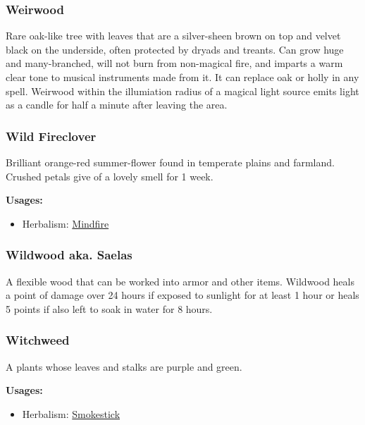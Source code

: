 \subsubsection{Weirwood}

Rare oak-like tree with leaves that are a silver-sheen brown on top and velvet black on the underside, often protected by dryads and treants. Can grow huge and many-branched, will not burn from non-magical fire, and imparts a warm clear tone to musical instruments made from it. It can replace oak or holly in any spell. Weirwood within the illumiation radius of a magical light source emits light as a candle for half a minute after leaving the area.

\subsubsection{Wild Fireclover}
\label{Wild Fireclover}

Brilliant orange-red summer-flower found in temperate plains and farmland. Crushed petals give of a lovely smell for 1 week.

\vspace{5mm}

\textbf{Usages:}

\begin{itemize}[noitemsep]
\item[] Herbalism: \hyperref[Mindfire]{Mindfire}
\end{itemize}

\subsubsection{Wildwood aka. Saelas}

A flexible wood that can be worked into armor and other items. Wildwood heals a point of damage over 24 hours if exposed to sunlight for at least 1 hour or heals 5 points if also left to soak in water for 8 hours.

\subsubsection{Witchweed}
\label{Witchweed}

A plants whose leaves and stalks are purple and green.

\vspace{5mm}

\textbf{Usages:}

\begin{itemize}[noitemsep]
\item[] Herbalism: \hyperref[Smokestick]{Smokestick}
\end{itemize}

